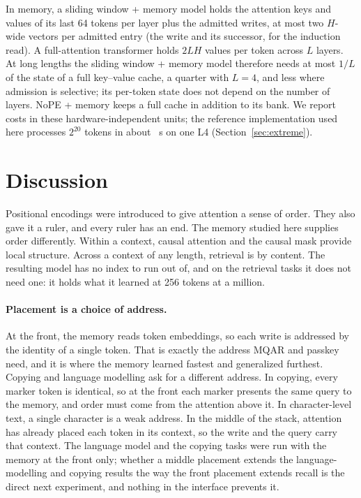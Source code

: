 \documentclass[11pt]{article}
\begin{document}
In memory, a sliding window + memory model holds the attention keys and values of
its last 64 tokens per layer plus the admitted writes, at most two $H$-wide vectors
per admitted entry (the write and its successor, for the induction read). A
full-attention transformer holds $2LH$ values per token across $L$ layers. At long
lengths the sliding window + memory model therefore needs at most $1/L$ of the state
of a full key--value cache, a quarter with $L=4$, and less where admission is
selective; its per-token state does not depend on the number of layers. NoPE +
memory keeps a full cache in addition to its bank. We report costs in these hardware-independent units; the reference implementation used
here processes $2^{20}$ tokens in about \extMemOneMSec~s on one L4
(Section~\ref{sec:extreme}).



\section{Discussion}
\label{sec:discussion}

Positional encodings were introduced to give attention a sense of order. They also
gave it a ruler, and every ruler has an end. The memory studied here supplies order
differently. Within a context, causal attention and the causal mask provide local
structure. Across a context of any length, retrieval is by content. The resulting
model has no index to run out of, and on the retrieval tasks it does not need one:
it holds what it learned at 256 tokens at a million.

\paragraph{Placement is a choice of address.} At the front, the memory reads token
embeddings, so each write is addressed by the identity of a single token. That is
exactly the address MQAR and passkey need, and it is where the memory learned
fastest and generalized furthest. Copying and language modelling ask for a different
address. In copying, every marker token is identical, so at the front each marker
presents the same query to the memory, and order must come from the attention above
it. In character-level text, a single character is a weak address. In the middle of
the stack, attention has already placed each token in its context, so the write and
the query carry that context. The language model and the copying tasks were run with
the memory at the front only; whether a middle placement extends the
language-modelling and copying results the way the front placement extends recall is
the direct next experiment, and nothing in the interface prevents it.
\end{document}
